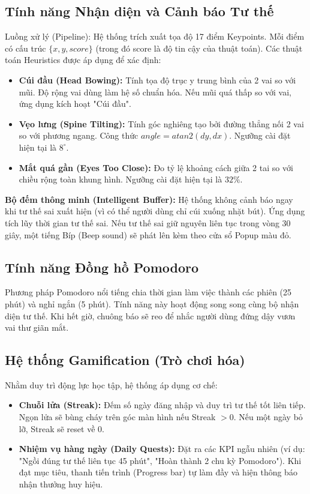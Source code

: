 \documentclass[12pt,a4paper]{report}
\begin{document}
\subsection{Tính năng Nhận diện và Cảnh báo Tư thế}
Luồng xử lý (Pipeline): Hệ thống trích xuất tọa độ 17 điểm Keypoints. Mỗi điểm có cấu trúc $\{x, y, score\}$ (trong đó score là độ tin cậy của thuật toán). Các thuật toán Heuristics được áp dụng để xác định:
\begin{itemize}
    \item \textbf{Cúi đầu (Head Bowing):} Tính tọa độ trục y trung bình của 2 vai so với mũi. Độ rộng vai dùng làm hệ số chuẩn hóa. Nếu mũi quá thấp so với vai, ứng dụng kích hoạt "Cúi đầu".
    \item \textbf{Vẹo lưng (Spine Tilting):} Tính góc nghiêng tạo bởi đường thẳng nối 2 vai so với phương ngang. Công thức $angle = atan2(dy, dx)$. Ngưỡng cài đặt hiện tại là $8^\circ$.
    \item \textbf{Mắt quá gần (Eyes Too Close):} Đo tỷ lệ khoảng cách giữa 2 tai so với chiều rộng toàn khung hình. Ngưỡng cài đặt hiện tại là $32\%$.
\end{itemize}
\textbf{Bộ đếm thông minh (Intelligent Buffer):} Hệ thống không cảnh báo ngay khi tư thế sai xuất hiện (vì có thể người dùng chỉ cúi xuống nhặt bút). Ứng dụng tích lũy thời gian tư thế sai. Nếu tư thế sai giữ nguyên liên tục trong vòng 30 giây, một tiếng Bíp (Beep sound) sẽ phát lên kèm theo cửa sổ Popup màu đỏ.

\subsection{Tính năng Đồng hồ Pomodoro}
Phương pháp Pomodoro nổi tiếng chia thời gian làm việc thành các phiên (25 phút) và nghỉ ngắn (5 phút). Tính năng này hoạt động song song cùng bộ nhận diện tư thế. Khi hết giờ, chuông báo sẽ reo để nhắc người dùng đứng dậy vươn vai thư giãn mắt.

\subsection{Hệ thống Gamification (Trò chơi hóa)}
Nhằm duy trì động lực học tập, hệ thống áp dụng cơ chế:
\begin{itemize}
    \item \textbf{Chuỗi lửa (Streak):} Đếm số ngày đăng nhập và duy trì tư thế tốt liên tiếp. Ngọn lửa sẽ bùng cháy trên góc màn hình nếu Streak $> 0$. Nếu một ngày bỏ lỡ, Streak sẽ reset về 0.
    \item \textbf{Nhiệm vụ hàng ngày (Daily Quests):} Đặt ra các KPI ngẫu nhiên (ví dụ: "Ngồi đúng tư thế liên tục 45 phút", "Hoàn thành 2 chu kỳ Pomodoro"). Khi đạt mục tiêu, thanh tiến trình (Progress bar) tự làm đầy và hiện thông báo nhận thưởng huy hiệu.
\end{itemize}
\end{document}
